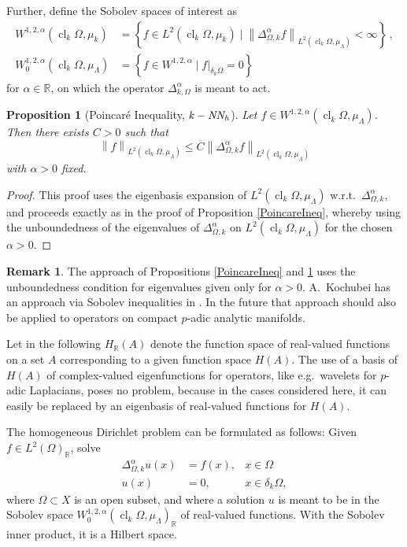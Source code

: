 \documentclass[a4paper,draft]{ZbRad}
\theoremstyle{plain}
\newtheorem{prop}{Proposition}[section]
\theoremstyle{definition}
\newtheorem{rem}{Remark}[section]
\numberwithin{equation}{section}
\renewcommand{\le}{\leqslant}\renewcommand{\leq}{\leqslant}
\newcommand{\mathset}[1]{{\left\{#1\right\}}}
\newcommand{\norm}[1]{\left\|#1\right\|}
\DeclareMathOperator{\kNNh}{\it{k-NN_h}}
\DeclareMathOperator{\closure}{cl}
\begin{document}
Further, define the Sobolev spaces of interest as
\begin{align*}
W^{1,2,\alpha}(\closure_k\Omega,\mu_k) 
&= \mathset{f \in L^2(\closure_k\Omega,\mu_k)\mid \norm{\Delta^\alpha_{\Omega,k} f}_{L^2(\closure_k\Omega,\mu_\Lambda)} < \infty}\,,
\\
W_0^{1,2,\alpha}(\closure_k\Omega,\mu_\Lambda) 
&=\mathset{f \in W^{1,2,\alpha}\mid f|_{\delta_k\Omega}=0}
\end{align*}
for $\alpha\in\mathbb{R}$, on which the operator $\Delta^\alpha_{k,\Omega}$ is meant to act.

\begin{prop}[Poincar\'e Inequality, $\kNNh$]\label{PIkNNh}
Let $f\in W^{1,2,\alpha}(\closure_k\Omega,\mu_\Lambda)$.
Then there exists $C > 0$ such that
\[
\norm{f}_{L^2(\closure_k \Omega,\mu_\Lambda)} \le 
C\norm{\Delta^\alpha_{\Omega,k}f}_{L^2(\closure_k\Omega,\mu_\Lambda)}
\]
with $\alpha > 0$ fixed.
\end{prop}

\begin{proof}
This proof uses the eigenbasis expansion of $L^2(\closure_k\Omega,\mu_\Lambda)$ w.r.t.\ $\Delta^\alpha_{\Omega,k}$,
and proceeds exactly as in the proof of Proposition \ref{PoincareIneq}, whereby using the
unboundedness of the eigenvalues of $\Delta^\alpha_{\Omega,k}$ on $L^2(\closure_k\Omega,\mu_\Lambda)$ for the chosen $\alpha > 0$.
\end{proof}

\begin{rem} The approach of Propositions \ref{PoincareIneq} and \ref{PIkNNh} uses the unboundedness condition for eigenvalues given only for $\alpha> 0$. 
A.\ Kochubei has an approach
via Sobolev inequalities in \cite{Kochubei2023}. In the future that approach should also be applied
to operators on compact $p$-adic analytic manifolds.
\end{rem}

Let in the following $H_{\mathbb{R}}(A)$ denote the function space of real-valued functions on a set $A$ corresponding to a given function space $H(A)$.
 The use of a basis of $H(A)$ of complex-valued eigenfunctions
for operators, like e.g.\ wavelets for $p$-adic Laplacians, poses no problem, because in the cases
considered here, it can easily be replaced by an eigenbasis of real-valued functions
for $H(A)$.
\newline

The homogeneous Dirichlet problem can be formulated as follows: Given
$f\in L^2(\Omega)_{\mathbb{R}}$, solve
\begin{align}\label{Dirichlet_kNNh}
\Delta^\alpha_{\Omega,k}u(x) &= f(x),&x\in\Omega
\\\nonumber
u(x) &= 0,&x \in\delta_k\Omega,
\end{align}
where $\Omega\subset X$ is an open subset, and where a solution $u$ is meant to be in the Sobolev space $W_0^{1,2,\alpha}(\closure_k\Omega,\mu_\Lambda)_{\mathbb{R}}$ of real-valued functions. With the Sobolev
inner product, it is a Hilbert space.
\newline
\end{document}
